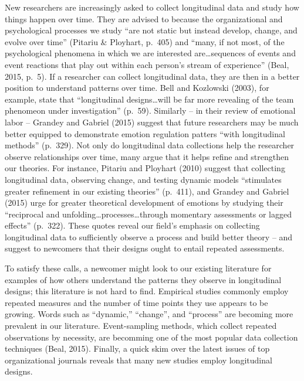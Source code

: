 \documentclass[english,,man]{apa6}
\theoremstyle{definition}
\theoremstyle{definition}
\theoremstyle{definition}
\theoremstyle{remark}
\begin{document}
New researchers are increasingly asked to collect longitudinal data and
study how things happen over time. They are advised to because the
organizational and psychological processes we study \enquote{are not
static but instead develop, change, and evolve over time} (Pitariu \&
Ployhart, p.~405) and \enquote{many, if not most, of the psychological
phenomena in which we are interested are\ldots{}sequences of events and
event reactions that play out within each person's stream of experience}
(Beal, 2015, p.~5). If a researcher can collect longitudinal data, they
are then in a better position to understand patterns over time. Bell and
Kozlowski (2003), for example, state that \enquote{longitudinal
designs\ldots{}will be far more revealing of the team phenomeon under
investigation} (p.~59). Similarly -- in their review of emotional labor
-- Grandey and Gabriel (2015) suggest that future researchers may be
much better equipped to demonstrate emotion regulation patters
\enquote{with longitudinal methods} (p.~329). Not only do longitudinal
data collections help the researcher observe relationships over time,
many argue that it helps refine and strengthen our theories. For
instance, Pitariu and Ployhart (2010) suggest that collecting
longitudinal data, observing change, and testing dynamic models
\enquote{stimulates greater refinement in our existing theories}
(p.~411), and Grandey and Gabriel (2015) urge for greater theoretical
development of emotions by studying their \enquote{reciprocal and
unfolding\ldots{}processes\ldots{}through momentary assessments or
lagged effects} (p.~322). These quotes reveal our field's emphasis on
collecting longitudinal data to sufficiently observe a process and build
better theory -- and suggest to newcomers that their designs ought to
entail repeated assessments.

To satisfy these calls, a newcomer might look to our existing literature
for examples of how others understand the patterns they observe in
longitudinal designs; this literature is not hard to find. Empirical
studies commonly employ repeated measures and the number of time points
they use appears to be growing. Words such as \enquote{dynamic,}
\enquote{change}, and \enquote{process} are becoming more prevalent in
our literature. Event-sampling methods, which collect repeated
observations by necessity, are becomming one of the most popular data
collection techniques (Beal, 2015). Finally, a quick skim over the
latest issues of top organizational journals reveals that many new
studies employ longitudinal designs.
\end{document}
